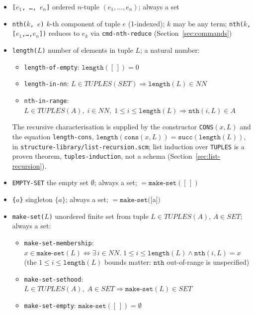 \begin{itemize}
\item \texttt{[$e_1$, \ldots, $e_n$]} ordered $n$-tuple $(e_1, \ldots, e_n)$; always a set
\item \texttt{nth($k$, $e$)} $k$-th component of tuple $e$ (1-indexed); $k$ may be any term;
  \texttt{nth($k$, [$e_1$,\ldots,$e_n$])} reduces to $e_k$ via
  \texttt{cmd-nth-reduce} (Section~\ref{sec:commands})
\item \texttt{length($L$)} number of elements in tuple $L$; a natural number:
  \begin{itemize}
  \item \texttt{length-of-empty}: $\texttt{length}([\,]) = 0$
  \item \texttt{length-in-nn}: $L \in \mathit{TUPLES}(\mathit{SET}) \Rightarrow
    \texttt{length}(L) \in \mathit{NN}$
  \item \texttt{nth-in-range}: $L \in \mathit{TUPLES}(A),\; i \in \mathit{NN},\;
    1 \le i \le \texttt{length}(L) \Rightarrow \texttt{nth}(i,L) \in A$
  \end{itemize}
  The recursive characterisation is supplied by the constructor
  \texttt{CONS}$(x,L)$ and the equation \texttt{length-cons},
  $\texttt{length}(\texttt{cons}(x,L)) = \texttt{succ}(\texttt{length}(L))$,
  in \texttt{structure-library/list-recursion.scm}; list induction over
  \texttt{TUPLES} is a proven theorem, \texttt{tuples-induction}, not a schema
  (Section~\ref{sec:list-recursion}).
\item \texttt{EMPTY-SET} the empty set $\emptyset$; always a set; $= \texttt{make-set}([\,])$
\item \texttt{\{$a$\}} singleton $\{a\}$; always a set; $= \texttt{make-set}([$a$])$
\item \texttt{make-set($L$)} unordered finite set from tuple $L \in \mathit{TUPLES}(A)$,
  $A \in \mathit{SET}$; always a set:
  \begin{itemize}
  \item \texttt{make-set-membership}: $x \in \texttt{make-set}(L)
    \Longleftrightarrow \exists\,i \in \mathit{NN}.\;
    1 \le i \le \texttt{length}(L) \land \texttt{nth}(i,L) = x$
    (the $1 \le i \le \texttt{length}(L)$ bounds matter:
    $\texttt{nth}$ out-of-range is unspecified)
  \item \texttt{make-set-sethood}: $L \in \mathit{TUPLES}(A),\; A \in \mathit{SET}
    \Rightarrow \texttt{make-set}(L) \in \mathit{SET}$
  \item \texttt{make-set-empty}: $\texttt{make-set}([\,]) = \emptyset$

\end{itemize}
\end{itemize}
